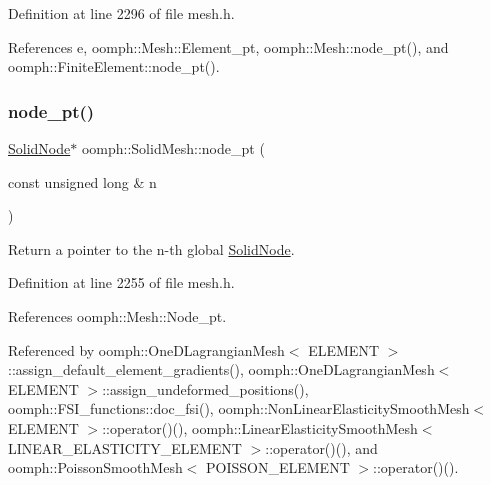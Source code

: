 Definition at line 2296 of file mesh.\+h.



References e, oomph\+::\+Mesh\+::\+Element\+\_\+pt, oomph\+::\+Mesh\+::node\+\_\+pt(), and oomph\+::\+Finite\+Element\+::node\+\_\+pt().

\mbox{\label{classoomph_1_1SolidMesh_a8b096888d09593a6cdec9ede72eb5850}} 
\subsubsection{\texorpdfstring{node\+\_\+pt()}{node\_pt()}}
{\footnotesize\ttfamily \hyperlink{classoomph_1_1SolidNode}{Solid\+Node}$\ast$ oomph\+::\+Solid\+Mesh\+::node\+\_\+pt (\begin{DoxyParamCaption}\item[{const unsigned long \&}]{n }\end{DoxyParamCaption})\hspace{0.3cm}{\ttfamily [inline]}}



Return a pointer to the n-\/th global \hyperlink{classoomph_1_1SolidNode}{Solid\+Node}. 



Definition at line 2255 of file mesh.\+h.



References oomph\+::\+Mesh\+::\+Node\+\_\+pt.



Referenced by oomph\+::\+One\+D\+Lagrangian\+Mesh$<$ E\+L\+E\+M\+E\+N\+T $>$\+::assign\+\_\+default\+\_\+element\+\_\+gradients(), oomph\+::\+One\+D\+Lagrangian\+Mesh$<$ E\+L\+E\+M\+E\+N\+T $>$\+::assign\+\_\+undeformed\+\_\+positions(), oomph\+::\+F\+S\+I\+\_\+functions\+::doc\+\_\+fsi(), oomph\+::\+Non\+Linear\+Elasticity\+Smooth\+Mesh$<$ E\+L\+E\+M\+E\+N\+T $>$\+::operator()(), oomph\+::\+Linear\+Elasticity\+Smooth\+Mesh$<$ L\+I\+N\+E\+A\+R\+\_\+\+E\+L\+A\+S\+T\+I\+C\+I\+T\+Y\+\_\+\+E\+L\+E\+M\+E\+N\+T $>$\+::operator()(), and oomph\+::\+Poisson\+Smooth\+Mesh$<$ P\+O\+I\+S\+S\+O\+N\+\_\+\+E\+L\+E\+M\+E\+N\+T $>$\+::operator()().

\mbox{\label{classoomph_1_1SolidMesh_ab1c6f1a9990c124c686193398a8364bb}} 
